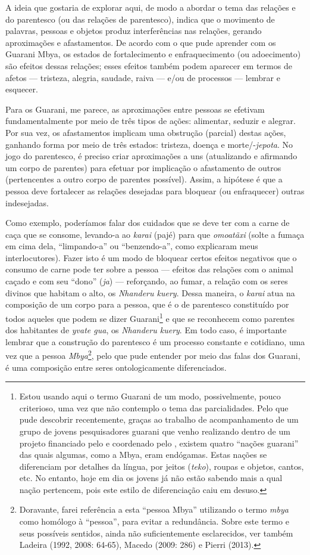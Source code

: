 A ideia que gostaria de explorar aqui, de modo a abordar o tema das
relações e do parentesco (ou das relações de parentesco), indica que o
movimento de palavras, pessoas e objetos produz interferências nas
relações, gerando aproximações e afastamentos. De acordo com o que pude
aprender com os Guarani Mbya, os estados de fortalecimento e
enfraquecimento (ou adoecimento) são efeitos dessas relações; esses
efeitos também podem aparecer em termos de afetos --- tristeza, alegria,
saudade, raiva --- e/ou de processos --- lembrar e esquecer.

Para os Guarani, me parece, as aproximações entre pessoas se efetivam
fundamentalmente por meio de três tipos de ações: alimentar, seduzir e
alegrar. Por sua vez, os afastamentos implicam uma obstrução (parcial)
destas ações, ganhando forma por meio de três estados: tristeza, doença
e morte/-\emph{jepota}. No jogo do parentesco, é preciso criar aproximações a
uns (atualizando e afirmando um corpo de parentes) para efetuar por
implicação o afastamento de outros (pertencentes a outro corpo de
parentes possível). Assim, a hipótese é que a pessoa deve fortalecer as
relações desejadas para bloquear (ou enfraquecer) outras indesejadas.

Como exemplo, poderíamos falar dos cuidados que se deve ter com a carne
de caça que se consome, levando-a ao \emph{karai} (pajé) para que \emph{omoatãxi}
(solte a fumaça em cima dela, ``limpando-a'' ou ``benzendo-a'', como
explicaram meus interlocutores). Fazer isto é um modo de bloquear
certos efeitos negativos que o consumo de carne pode ter sobre a pessoa
--- efeitos das relações com o animal caçado e com seu ``dono'' (\emph{ja}) ---
reforçando, ao fumar, a relação com os seres divinos que habitam o
alto, os \emph{Nhanderu kuery}. Dessa maneira, o \emph{karai} atua na composição de
um corpo para a pessoa, que é o de parentesco constituído por todos
aqueles que podem se dizer Guarani\footnote{Estou usando aqui o termo
Guarani de um modo, possivelmente, pouco criterioso, uma vez que não
contemplo o tema das parcialidades. Pelo que pude descobrir
recentemente, graças ao trabalho de acompanhamento de um grupo de
jovens pesquisadores guarani que venho realizando dentro de um projeto
financiado pelo  e coordenado pelo , existem quatro ``nações
guarani'' das quais algumas, como a Mbya, eram endógamas. Estas nações
se diferenciam por detalhes da língua, por jeitos (\emph{teko}), roupas e
objetos, cantos, etc. No entanto, hoje em dia os jovens já não estão
sabendo mais a qual nação pertencem, pois este estilo de diferenciação
caiu em desuso.} e que se reconhecem como parentes dos habitantes de
\emph{yvate gua}, os \emph{Nhanderu kuery}. Em todo caso, é importante lembrar que a
construção do parentesco é um processo constante e cotidiano, uma vez
que a pessoa \emph{Mbya}\footnote{Doravante, farei referência a esta ``pessoa
Mbya'' utilizando o termo \emph{mbya} como homólogo à ``pessoa'', para evitar a
redundância. Sobre este termo e seus possíveis sentidos, ainda não
suficientemente esclarecidos, ver também Ladeira (1992, 2008: 64-65),
Macedo (2009: 286) e Pierri (2013).}, pelo que pude entender por meio
das falas dos Guarani, é uma composição entre seres ontologicamente
diferenciados.

